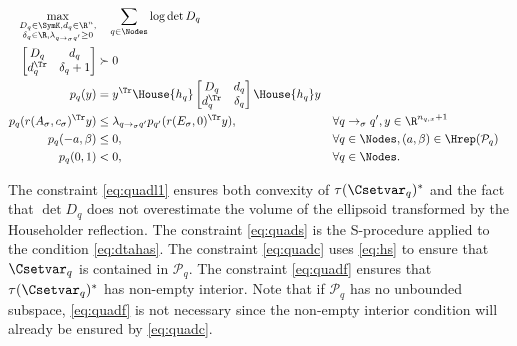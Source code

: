 \documentclass[11pt,twoside,a4paper,openright]{uclouvain-thesis}
\newcommand{\tr}{\to}
\newcommand{\trs}[1][\sigma]{\tr_{#1}}
\newcommand{\nqx}{n_{q,x}}
\newcommand{\Ps}{\mathcal{P}}
\begin{document}
\begin{myprog}
  \label{prog:quad}
  \begin{align}
    \notag
    \max_{\substack{D_q \in \SymK, d_q \in \R^n,\\\delta_q \in \R, \lambda_{q \trs q'} \geq 0}}
    & \quad \sum_{q \in \Nodes} \log \det D_q
    \\
    \label{eq:quadl1}
    \begin{bmatrix}
      D_q & d_q\\
      d_q^\Tr & \delta_q + 1
    \end{bmatrix} & \succ 0\\ %
    \label{eq:quadp}
    p_q(y) & = y^\Tr \House{h_q}
    \begin{bmatrix}
      D_q & d_q\\
      d_q^\Tr & \delta_q
    \end{bmatrix}
    \House{h_q} y\\
    \label{eq:quads}
    p_q(r(A_\sigma, c_\sigma)^\Tr y) & \leq \lambda_{q \trs q'} p_{q'}(r(E_\sigma, 0)^{\Tr} y),
    && \forall q \trs q', y \in \R^{\nqx+1}\\
    \label{eq:quadc}
    p_q(-a, \beta) & \leq 0,
    && \forall q \in \Nodes, (a, \beta) \in \Hrep(\Ps_q)\\
    \label{eq:quadf}
    p_q(0, 1) & < 0,
    && \forall q \in \Nodes.
  \end{align}
\end{myprog}

The constraint \eqref{eq:quadl1} ensures both convexity of $\tau(\Csetvar_q)^*$ and the fact that $\det D_q$ does not overestimate the volume of the ellipsoid transformed by the Householder reflection.
The constraint \eqref{eq:quads} is the S-procedure applied to the condition \eqref{eq:dtahas}.
The constraint \eqref{eq:quadc} uses \eqref{eq:hs} to ensure that $\Csetvar_q$ is contained in $\Ps_q$.
The constraint \eqref{eq:quadf} ensures that $\tau(\Csetvar_q)^*$ has non-empty interior.
Note that if $\Ps_q$ has no unbounded subspace, \eqref{eq:quadf} is not necessary since the non-empty interior condition will already be ensured by \eqref{eq:quadc}.
\end{document}

